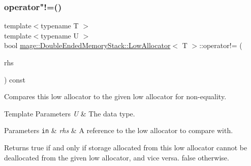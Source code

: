 \subsubsection{\texorpdfstring{operator"!=()}{operator!=()}}
{\footnotesize\ttfamily template$<$typename T $>$ \\
template$<$typename U $>$ \\
bool \mbox{\hyperlink{classmage_1_1_double_ended_memory_stack_1_1_low_allocator}{mage\+::\+Double\+Ended\+Memory\+Stack\+::\+Low\+Allocator}}$<$ T $>$\+::operator!= (\begin{DoxyParamCaption}\item[{const \mbox{\hyperlink{classmage_1_1_double_ended_memory_stack_1_1_low_allocator}{Low\+Allocator}}$<$ U $>$ \&}]{rhs }\end{DoxyParamCaption}) const\hspace{0.3cm}{\ttfamily [noexcept]}}

Compares this low allocator to the given low allocator for non-\/equality.


\begin{DoxyTemplParams}{Template Parameters}
{\em U} & The data type. \\
\hline
\end{DoxyTemplParams}

\begin{DoxyParams}[1]{Parameters}
\mbox{\tt in}  & {\em rhs} & A reference to the low allocator to compare with. \\
\hline
\end{DoxyParams}
\begin{DoxyReturn}{Returns}
{\ttfamily true} if and only if storage allocated from this low allocator cannot be deallocated from the given low allocator, and vice versa. {\ttfamily false} otherwise. 
\end{DoxyReturn}
\mbox{\label{classmage_1_1_double_ended_memory_stack_1_1_low_allocator_a709076f9dc2e900814039cecd145d32a}} 
